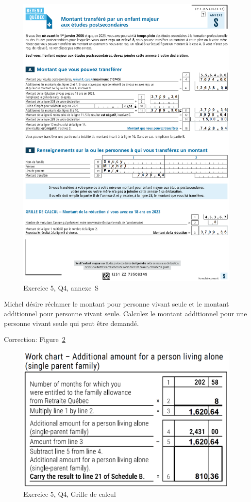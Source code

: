 \begin{figure}
	\centering
	\includegraphics[width=.9\textwidth]{exercice/4-5/Q4/Annexe-S.png}
	\caption{Exercice 5, Q4, annexe~S}
	\label{fig:chap4Exercice5Q4AnnexeS}
\end{figure}

\begin{sousQuestion}
	Michel désire réclamer le montant pour personne vivant seule et le montant additionnel pour personne vivant seule. Calculez le montant additionnel pour une personne vivant seule qui peut être demandé.
	
\end{sousQuestion}
Correction: Figure~\ref{fig:chap4Exercice5Q4GrilleCalcul}
\begin{figure}
	\centering
	\includegraphics[width=.5\textwidth]{exercice/4-5/Q4/GrilleCalcul.png}
	\caption{Exercice 5, Q4, Grille de calcul}
	\label{fig:chap4Exercice5Q4GrilleCalcul}
\end{figure}


